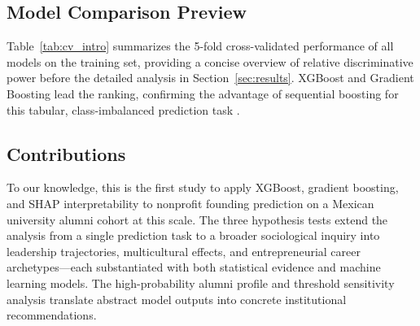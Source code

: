 \documentclass[10pt,twocolumn]{article}
\begin{document}
\subsection{Model Comparison Preview}

Table~\ref{tab:cv_intro} summarizes the 5-fold cross-validated performance of all models on the training set, providing a concise overview of relative discriminative power before the detailed analysis in Section~\ref{sec:results}. XGBoost and Gradient Boosting lead the ranking, confirming the advantage of sequential boosting for this tabular, class-imbalanced prediction task \cite{karimabdallah2025}.

\begin{table}[H]
\centering
\caption{5-fold CV results (training set, $n = 20{,}284$). Models ranked by ROC-AUC. XGBoost and Gradient Boosting lead; Gaussian NB performs at chance.}
\label{tab:cv_intro}
\end{table}

\subsection{Contributions}

To our knowledge, this is the first study to apply XGBoost, gradient boosting, and SHAP interpretability to nonprofit founding prediction on a Mexican university alumni cohort at this scale. The three hypothesis tests extend the analysis from a single prediction task to a broader sociological inquiry into leadership trajectories, multicultural effects, and entrepreneurial career archetypes—each substantiated with both statistical evidence and machine learning models. The high-probability alumni profile and threshold sensitivity analysis translate abstract model outputs into concrete institutional recommendations.
\end{document}
